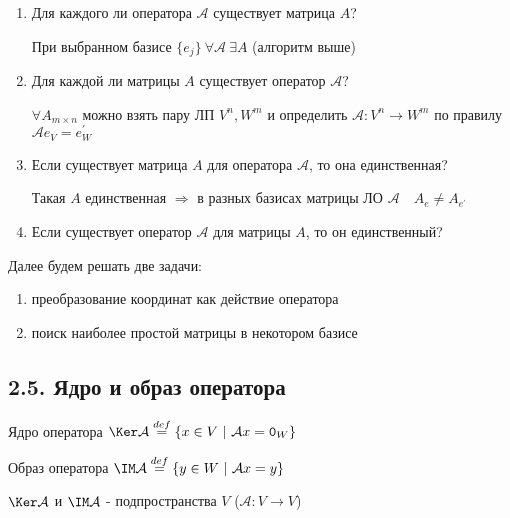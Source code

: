 \documentclass[12pt]{article}
\begin{document}
    \begin{enumerate}
        \item Для каждого ли оператора $\mathcal{A}$ существует матрица $A$?

        При выбранном базисе $\{e_j\} \ \forall \mathcal{A} \ \exists A$ (алгоритм выше)

        \item Для каждой ли матрицы $A$ существует оператор $\mathcal{A}$?

        $\forall A_{m\times n}$ можно взять пару ЛП $V^n, W^m$ и определить $\mathcal{A} : V^n \rightarrow W^m$ по правилу $\mathcal{A}e_V = e^\prime_W$

        \item Если существует матрица $A$ для оператора $\mathcal{A}$, то она единственная?

        Такая $A$ единственная $\Longrightarrow$ в разных базисах матрицы ЛО $\mathcal{A} \quad A_e \neq A_{e^\prime}$

        \item Если существует оператор $\mathcal{A}$ для матрицы $A$, то он единственный?

        \Lab
    \end{enumerate}

    \Nota Далее будем решать две задачи:

    \begin{enumerate}
        \item преобразование координат как действие оператора

        \item поиск наиболее простой матрицы в некотором базисе
    \end{enumerate}

    \subsection{2.5. Ядро и образ оператора}

    \hypertarget{kernalandimageofoperator}{}

    \Defs Ядро оператора $\Ker \mathcal{A} \stackrel{def}{=} \{x \in V \ | \ \mathcal{A}x = \texttt{0}_W\}$

    \Defs Образ оператора $\IM \mathcal{A} \stackrel{def}{=} \{y \in W \ | \ \mathcal{A}x = y\}$


    \Notas $\Ker \mathcal{A}$ и $\IM \mathcal{A}$ - подпространства $V$ ($\mathcal{A} : V \rightarrow V$)
\end{document}

